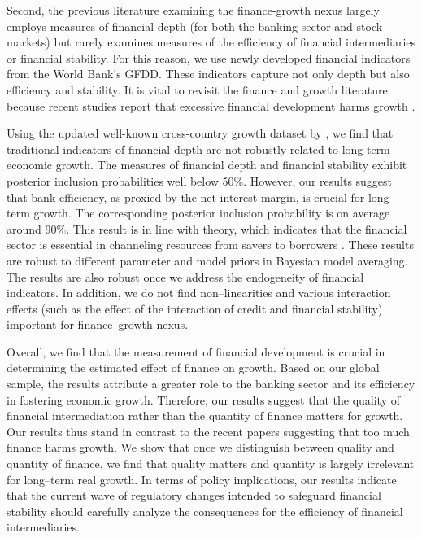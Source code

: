 \begin{refsection}
Second, the previous literature examining the finance-growth nexus largely employs measures of financial depth (for both the banking sector and stock markets) but rarely examines measures of the efficiency of financial intermediaries or financial stability. For this reason, we use newly developed financial indicators from the World Bank's \ac{GFDD}. These indicators capture not only depth but also efficiency and stability. It is vital to revisit the finance and growth literature because recent studies report that excessive financial development harms growth \parencite{CecchettiKharroubi2012}.

Using the updated well-known cross-country growth dataset by \textcite{Fernandezetal2001}, we find that traditional indicators of financial depth are not robustly related to long-term economic growth. The measures of financial depth and financial stability exhibit posterior inclusion probabilities well below 50\%. However, our results suggest that bank efficiency, as proxied by the net interest margin, is crucial for long-term growth. The corresponding posterior inclusion probability is on average around 90\%. This result is in line with theory, which indicates that the financial sector is essential in channeling resources from savers to borrowers \textcite{Pagano1993}. These results are robust to different parameter and model priors in Bayesian model averaging. The results are also robust once we address the endogeneity of financial indicators. In addition, we do not find non--linearities and various interaction effects (such as the effect of the interaction of credit and financial stability) important for finance--growth nexus. 

Overall, we find that the measurement of financial development is crucial in determining the estimated effect of finance on growth. Based on our global sample, the results attribute a greater role to the banking sector and its efficiency in fostering economic growth. Therefore, our results suggest that the quality of financial intermediation rather than the quantity of finance matters for growth. Our results thus stand in contrast to the recent papers suggesting that too much finance harms growth. We show that once we distinguish between quality and quantity of finance, we find that quality matters and quantity is largely irrelevant for long--term real growth. In terms of policy implications, our results indicate that the current wave of regulatory changes intended to safeguard financial stability should carefully analyze the consequences for the efficiency of financial intermediaries.


\end{refsection}

